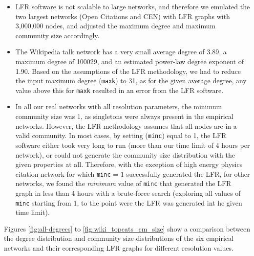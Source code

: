 \documentclass[a4paper]{article}   	%
\begin{document}
\begin{itemize}
    \item LFR software is not scalable to large networks, and therefore we emulated the two largest networks (Open Citations and CEN) with LFR graphs with 3,000,000 nodes, and adjusted the maximum degree and maximum community size accordingly.
    \item The Wikipedia talk network has a very small average degree of 3.89, a maximum degree of 100029, and an estimated power-law degree exponent of 1.90. Based on the assumptions of the LFR methodology, we had to reduce the input maximum degree (\texttt{maxk}) to 31, as for the given average degree, any value above this for \texttt{maxk} resulted in an error from the LFR software.
    \item In all our real networks with all resolution parameters, the minimum community size was 1, as singletons were always present in the empirical networks. However, the LFR methodology assumes that all nodes are in a valid community. In most cases, by setting (\texttt{minc}) equal to 1, the LFR software either took very long to run (more than our time limit of 4 hours per network), or could not generate the community size distribution with the given properties at all. Therefore, with the exception of high energy physics citation network for which \texttt{minc} = 1 successfully generated the LFR, for other networks, we found the \textit{minimum} value of \texttt{minc} that generated the LFR graph in less than 4 hours with a brute-force search (exploring all values of \texttt{minc} starting from 1, to the point were the LFR was generated int he given time limit).
\end{itemize}

Figures \ref{fig:all-degrees} to \ref{fig:wiki_topcats_cm_size} show a comparison between the degree distribution and community size distributions of the six empirical networks and their corresponding LFR graphs for different resolution values.
\end{document}
